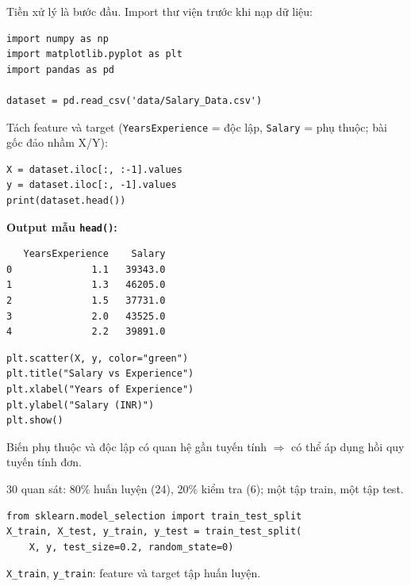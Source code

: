 \begin{vidu}[title={Bước 1: Chuẩn bị dữ liệu (Data Preparation)}]
Tiền xử lý là bước đầu. Import thư viện trước khi nạp dữ liệu:

\begin{lstlisting}
import numpy as np
import matplotlib.pyplot as plt
import pandas as pd

dataset = pd.read_csv('data/Salary_Data.csv')
\end{lstlisting}

Tách feature và target (\texttt{YearsExperience} = độc lập, \texttt{Salary} = phụ thuộc; bài gốc đảo nhầm X/Y):

\begin{lstlisting}
X = dataset.iloc[:, :-1].values
y = dataset.iloc[:, -1].values
print(dataset.head())
\end{lstlisting}

\textbf{Output mẫu \texttt{head()}:}
\begin{verbatim}
   YearsExperience    Salary
0              1.1   39343.0
1              1.3   46205.0
2              1.5   37731.0
3              2.0   43525.0
4              2.2   39891.0
\end{verbatim}
\end{vidu}

\begin{vidu}[title={Kiểm tra tuyến tính của dataset}]
\begin{lstlisting}
plt.scatter(X, y, color="green")
plt.title("Salary vs Experience")
plt.xlabel("Years of Experience")
plt.ylabel("Salary (INR)")
plt.show()
\end{lstlisting}


\begin{ynghia}[title={Kết luận từ biểu đồ}]
Biến phụ thuộc và độc lập có quan hệ gần tuyến tính $\Rightarrow$ có thể áp dụng hồi quy tuyến tính đơn.
\end{ynghia}
\end{vidu}

\begin{vidu}[title={Chia tập huấn luyện và kiểm tra}]
30 quan sát: 80\% huấn luyện (24), 20\% kiểm tra (6); một tập train, một tập test.

\begin{lstlisting}
from sklearn.model_selection import train_test_split
X_train, X_test, y_train, y_test = train_test_split(
    X, y, test_size=0.2, random_state=0)
\end{lstlisting}

\texttt{X\_train}, \texttt{y\_train}: feature và target tập huấn luyện.
\end{vidu}

